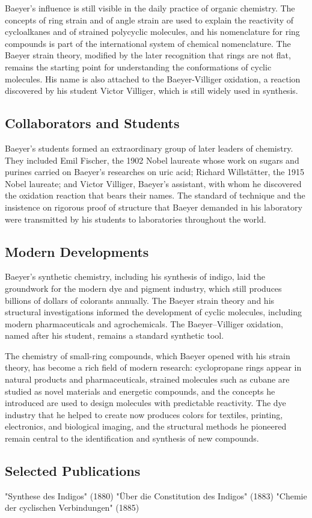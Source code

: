 Baeyer's influence is still visible in the daily practice of organic chemistry. The concepts of ring strain and of angle strain are used to explain the reactivity of cycloalkanes and of strained polycyclic molecules, and his nomenclature for ring compounds is part of the international system of chemical nomenclature. The Baeyer strain theory, modified by the later recognition that rings are not flat, remains the starting point for understanding the conformations of cyclic molecules. His name is also attached to the Baeyer-Villiger oxidation, a reaction discovered by his student Victor Villiger, which is still widely used in synthesis.

\subsection*{Collaborators and Students}

Baeyer's students formed an extraordinary group of later leaders of chemistry. They included Emil Fischer, the 1902 Nobel laureate whose work on sugars and purines carried on Baeyer's researches on uric acid; Richard Willstätter, the 1915 Nobel laureate; and Victor Villiger, Baeyer's assistant, with whom he discovered the oxidation reaction that bears their names. The standard of technique and the insistence on rigorous proof of structure that Baeyer demanded in his laboratory were transmitted by his students to laboratories throughout the world.

\subsection*{Modern Developments}

Baeyer's synthetic chemistry, including his synthesis of indigo, laid the groundwork for the modern dye and pigment industry, which still produces billions of dollars of colorants annually. The Baeyer strain theory and his structural investigations informed the development of cyclic molecules, including modern pharmaceuticals and agrochemicals. The Baeyer–Villiger oxidation, named after his student, remains a standard synthetic tool.

The chemistry of small-ring compounds, which Baeyer opened with his strain theory, has become a rich field of modern research: cyclopropane rings appear in natural products and pharmaceuticals, strained molecules such as cubane are studied as novel materials and energetic compounds, and the concepts he introduced are used to design molecules with predictable reactivity. The dye industry that he helped to create now produces colors for textiles, printing, electronics, and biological imaging, and the structural methods he pioneered remain central to the identification and synthesis of new compounds.

\subsection*{Selected Publications}

"Synthese des Indigos" (1880)
"Über die Constitution des Indigos" (1883)
"Chemie der cyclischen Verbindungen" (1885)

